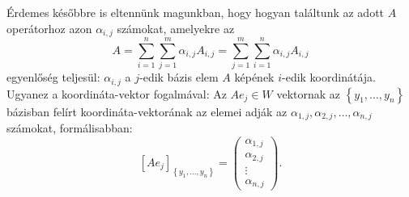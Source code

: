 \documentclass[a4paper, showtrims]{memoir}
\theoremstyle{plain}
\theoremstyle{remark}
\theoremstyle{definition}
\begin{document}
Érdemes későbbre is eltennünk magunkban,
hogy hogyan találtunk az adott $A$ operátorhoz azon $\alpha_{i,j}$ számokat,
amelyekre az
\[
	A=
	\sum_{i=1}^n\sum_{j=1}^m\alpha_{i,j}A_{i,j}
	=
	\sum_{j=1}^m\sum_{i=1}^n\alpha_{i,j}A_{i,j}
\]
egyenlőség teljesül:
$\alpha_{i,j}$ a $j$-edik bázis elem $A$ képének $i$-edik koordinátája.
Ugyanez a koordináta-vektor fogalmával:
Az $Ae_j\in W$ vektornak az $\left\{ y_1,\ldots,y_n \right\}$ bázisban felírt koordináta-vektorának az elemei
adják az $\alpha_{1,j},\alpha_{2,j},\ldots,\alpha_{n,j}$ számokat, formálisabban:
\[
	\left[ Ae_j \right]_{\left\{ y_1,\ldots,y_n \right\}}
	=
	\begin{pmatrix}
		\alpha_{1,j} \\ \alpha_{2,j}\\ \vdots \\ \alpha_{n,j}
	\end{pmatrix}.
\]
\end{document}
